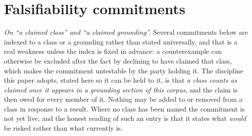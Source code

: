 \documentclass[11pt,a4paper]{article}
\theoremstyle{remark}
\begin{document}
\section{Falsifiability commitments}\label{sec:falsifiability}

\noindent\emph{On ``a claimed class'' and ``a claimed grounding''.} Several commitments below are
indexed to a class or a grounding rather than stated universally, and that is a real weakness unless
the index is fixed in advance: a counterexample can otherwise be excluded after the fact by declining
to have claimed that class, which makes the commitment untestable by the party holding it. The
discipline this paper adopts, stated here so it can be held to it, is that \emph{a class counts as
claimed once it appears in a grounding section of this corpus}, and the claim is then owed for every
member of it. Nothing may be added to or removed from a class in response to a result. Where no class
has been named the commitment is not yet live, and the honest reading of such an entry is that it
states what \emph{would} be risked rather than what currently is.
\end{document}
